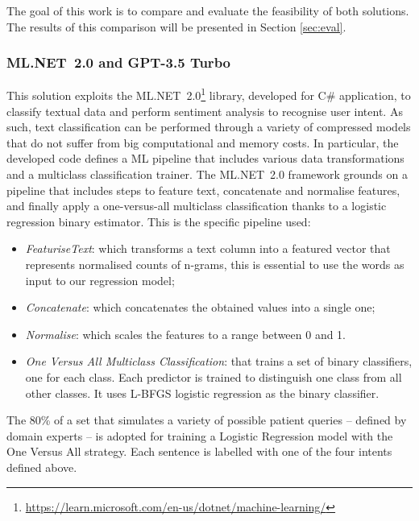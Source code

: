 \documentclass[preprint,12pt]{elsarticle}
\newcommand{\stefano}[1]{{\color{blue}{\textbf{[Stefano]}~#1}}}
\newcommand{\gamm}[1]{{\color{green}{\textbf{[Gianlu-Matte]}~#1}}}
\begin{document}
The goal of this work is to compare and evaluate the feasibility of both solutions. The results of this comparison will be presented in Section \ref{sec:eval}.

\subsubsection{ML.NET~2.0 and GPT-3.5 Turbo}
This solution exploits the ML.NET~2.0\footnote{\url{https://learn.microsoft.com/en-us/dotnet/machine-learning/}} library, developed for C\# application, to classify textual data and perform sentiment analysis to recognise user intent. 
%
%
As such, text classification can be performed through a variety of compressed models that do not suffer from big computational and memory costs.
In particular, the developed code defines a ML pipeline that includes various data transformations and a multiclass classification trainer. 
%
The ML.NET~2.0 framework grounds on a pipeline that includes steps to feature text, concatenate and normalise features, and finally apply a one-versus-all multiclass classification thanks to a logistic regression binary estimator. This is the specific pipeline used:
\begin{itemize}
    \item \emph{FeaturiseText}: which transforms a text column into a featured vector that represents normalised counts of n-grams, this is essential to use the words as input to our regression model;
    \item \emph{Concatenate}: which concatenates the obtained values into a single one;
    \item \emph{Normalise}: which scales the features to a range between 0 and 1.
    \item \emph{One Versus All Multiclass Classification}: that trains a set of binary classifiers, one for each class. Each predictor is trained to distinguish one class from all other classes. It uses L-BFGS logistic regression as the binary classifier.
\end{itemize}
%
The 80\% of a set that simulates a variety of possible patient queries -- defined by domain experts -- is adopted for training a Logistic Regression model with the One Versus All strategy.
%
Each sentence is labelled with one of the four intents defined above.
\end{document}
